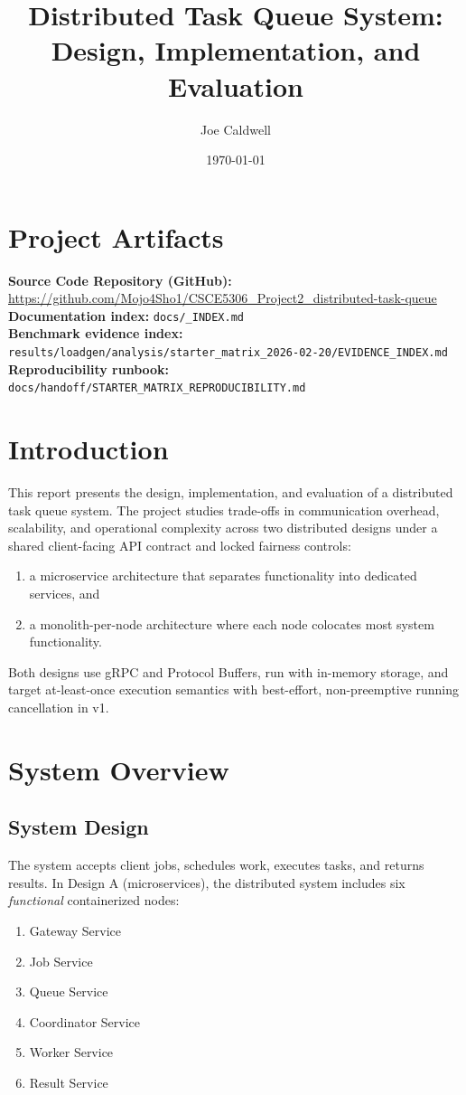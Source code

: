 \documentclass[11pt]{article}
\title{\textbf{Distributed Task Queue System:\\Design, Implementation, and Evaluation}}
\author{Joe Caldwell}
\date{\today}
\begin{document}
\maketitle

\section*{Project Artifacts}
\textbf{Source Code Repository (GitHub):} \url{https://github.com/Mojo4Sho1/CSCE5306_Project2_distributed-task-queue}\\
\textbf{Documentation index:} \texttt{docs/\_INDEX.md}\\
\textbf{Benchmark evidence index:} \texttt{results/loadgen/analysis/starter\_matrix\_2026-02-20/EVIDENCE\_INDEX.md}\\
\textbf{Reproducibility runbook:} \texttt{docs/handoff/STARTER\_MATRIX\_REPRODUCIBILITY.md}

\section{Introduction}
This report presents the design, implementation, and evaluation of a distributed task queue system.
The project studies trade-offs in communication overhead, scalability, and operational complexity across two distributed designs under a shared client-facing API contract and locked fairness controls:
\begin{enumerate}[label=(\alph*)]
    \item a microservice architecture that separates functionality into dedicated services, and
    \item a monolith-per-node architecture where each node colocates most system functionality.
\end{enumerate}
Both designs use gRPC and Protocol Buffers, run with in-memory storage, and target at-least-once execution semantics with best-effort, non-preemptive running cancellation in v1.

\section{System Overview}

\subsection{System Design}
The system accepts client jobs, schedules work, executes tasks, and returns results.
In Design A (microservices), the distributed system includes six \emph{functional} containerized nodes:
\begin{enumerate}
    \item Gateway Service
    \item Job Service
    \item Queue Service
    \item Coordinator Service
    \item Worker Service
    \item Result Service
\end{enumerate}
\end{document}
